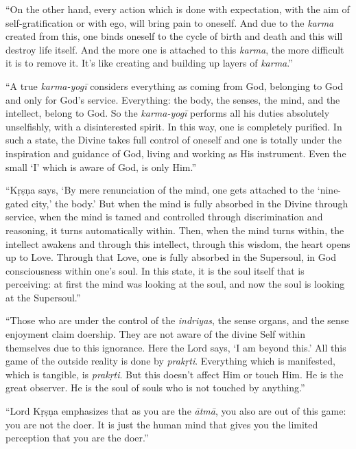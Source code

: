 \enquote{On the other hand, every action which is done with expectation, with the aim of self-gratification or with ego, will bring pain to oneself. And due to the \textit{karma} created from this, one binds oneself to the cycle of birth and death and this will destroy life itself. And the more one is attached to this \textit{karma}, the more difficult it is to remove it. It’s like creating and building up layers of \textit{karma}.}

\enquote{A true \textit{karma-yogī} considers everything as coming from God, belonging to God and only for God’s service. Everything: the body, the senses, the mind, and the intellect, belong to God. So the \textit{karma-yogī} performs all his duties absolutely unselfishly, with a disinterested spirit. In this way, one is completely purified. In such a state, the Divine takes full control of oneself and one is totally under the inspiration and guidance of God, living and working as His instrument. Even the small \enquote{I} which is aware of God, is only Him.}

\enquote{Kṛṣṇa says, \enquote{By mere renunciation of the mind, one gets attached to the ‘nine-gated city,’ the body.} But when the mind is fully absorbed in the Divine through service, when the mind is tamed and controlled through discrimination and reasoning, it turns automatically within. Then, when the mind turns within, the intellect awakens and through this intellect, through this wisdom, the heart opens up to Love. Through that Love, one is fully absorbed in the Supersoul, in God consciousness within one’s soul. In this state, it is the soul itself that is perceiving: at first the mind was looking at the soul, and now the soul is looking at the Supersoul.}

\enquote{Those who are under the control of the \textit{indriyas}, the sense organs, and the sense enjoyment claim doership. They are not aware of the divine Self within themselves due to this ignorance. Here the Lord says, \enquote{I am beyond this.} All this game of the outside reality is done by \textit{prakṛti}. Everything which is manifested, which is tangible, is \textit{prakṛti}. But this doesn’t affect Him or touch Him. He is the great observer. He is the soul of souls who is not touched by anything.}

\enquote{Lord Kṛṣṇa emphasizes that as you are the \textit{ātmā}, you also are out of this game: you are not the doer. It is just the human mind that gives you the limited perception that you are the doer.}

